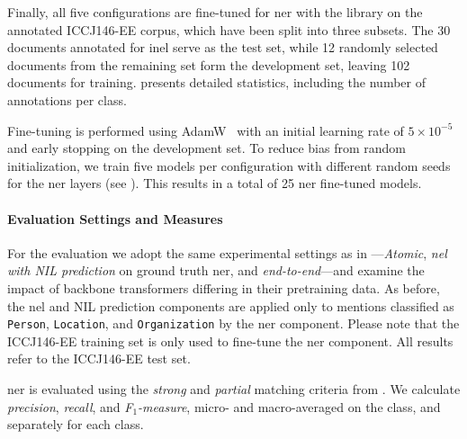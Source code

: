 Finally, all five configurations are fine-tuned for \ac{ner} with the \spacy library on the annotated ICCJ146-EE corpus, which have been split into three subsets. The 30 documents annotated for \ac{inel} serve as the test set, while 12 randomly selected documents from the remaining set form the development set, leaving 102 documents for training.  presents detailed statistics, including the number of annotations per class.

Fine-tuning is performed using AdamW~\cite{loshchilov2018decoupled} with an initial learning rate of $5 \times 10^{-5}$ and early stopping on the development set.
To reduce bias from random initialization, we train five models per configuration with different random seeds for the \ac{ner} layers (see ). This results in a total of 25 \ac{ner} fine-tuned models.






\paragraph{Evaluation Settings and Measures}
For the evaluation we adopt the same experimental settings as in ---\textit{Atomic}, \textit{\ac{nel} with NIL prediction} on ground truth \ac{ner}, and \textit{end-to-end}---and examine the impact of backbone transformers differing in their pretraining data.
As before, the \ac{nel} and NIL prediction components are applied only to mentions classified as \texttt{Person}, \texttt{Location}, and \texttt{Organization} by the \ac{ner} component.
%
Please note that the ICCJ146-EE training set is only used to fine-tune the \ac{ner} component. All results refer to the ICCJ146-EE test set. 

\ac{ner} is evaluated using the \textit{strong} and \textit{partial} matching criteria from .
We calculate \textit{precision}, \textit{recall}, and \textit{F$_1$-measure}, micro- and macro-averaged on the class, and separately for each class.


